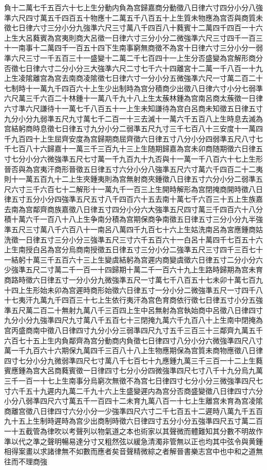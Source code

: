 負十二萬七千五百六十七上生分動内負為宫歸嘉商分動徵八日律六寸四分小分八強準六尺四寸萬五千四百五十物應十二萬五千八百五十上生質未物應為宫否與商質未徵七日律六寸三分小分九強準六尺三寸萬八千四百八十蕤賓十二萬四千四百一十六上生大呂蕤賓為宫夷則商大呂徵一日律六寸三分小分二微強準六尺三寸四千一百三十一南事十二萬四千一百五十四下生南事窮無商徵不為宮十日律六寸三分小分一弱準六尺三寸一千五百三十一盛變十二萬二千七百四十一上生分否盛變為宫解形商分否徵七日律六寸二分小分三大強準六尺二寸七千六十四離宮十二萬一千八百一十九上生凌隂離宫為宫去南商凌隂徵七日律六寸一分小分五微強凖六尺一寸萬二百二十七制時十一萬九千四百六十上生少出制時為宫分積商少出徵八日律六寸小分七弱準六尺萬三千六百二十林鍾十一萬八千九十八上生太蔟林鍾為宫南呂商太蔟徵一日律六寸準六尺謙待十一萬七千八百五十一上生未知謙待為宫白呂商未知徵五日律五寸九分小分九弱準五尺九寸萬七千二百一十三去滅十一萬六千五百八上生時息去滅為宫結躬商時息徵七日律五寸九分小分二弱準五尺九寸三千七百八十三安度十一萬四千九百四十上生屈齊安度為宫歸期商屈齊徵六日律五寸八分小分四弱準五尺八寸七千七百八十六歸嘉十一萬三千三百九十三上生随期歸嘉為宫未卯商随期徵六日律五寸七分小分六微強準五尺七寸萬一千九百九十九否與十一萬一千八百六十七上生形晉否與為宫夷汗商形晉徵五日律五寸六分小分八強準五尺六寸萬六千四百二十二夷則十一萬五百九十二上生夾鍾夷則為宫無射商夾鍾徵八日律五寸六分小分二弱準五尺六寸三千六百七十二解形十一萬九千一百三上生開時解形為宫閉掩商開時徵八日律五寸五分小分四強準五尺五寸八千四百六十五去南十萬七千六百三十五上生族嘉去南為宫鄰齊商族嘉徵八日律五寸四分小分六大強準五尺四寸萬三千四百六十八分積十萬六千一百八十八上生争南分積為宫期保商争南徵五日律五寸三分小分九半強準五尺三寸萬八千六百八十一南呂八萬四千九百七十六上生姑洗南呂為宮應鍾商姑洗徵一日律五寸三分小分三強準五尺三寸六千五百六十一白呂十萬四千七百五十六上生南授白呂為宫分烏商南授徵五日律五寸三分小分二強準五尺三寸四千三百七十一結躬十萬三千五百六十三上生變虞結躬為宫遲内商變虞徵六日律五寸二分小分六少強準五尺二寸萬二千一百一十四歸期十萬二千一百六十九上生路時歸期為宫未育商路時徵六日律五寸一分小分九微強準五尺一寸萬七千八百五十七未卯十萬七百九十四上生形始未卯為宫遲時商形始徵六日律五寸一分小分二微強準五尺一寸四千八十七夷汗九萬九千四百三十七上生依行夷汗為宫色育商依行徵七日律五寸小分五強準五尺萬二百二十無射九萬八千三百四上生中呂無射為宫執始商中呂徵八日律四寸九分小分九強準四尺九寸萬八千五百七十三閉掩九萬六千九百八十上生南中閉掩為宫丙盛商南中徵八日律四寸九分小分三弱準四尺九寸五千三百三十三鄰齊九萬五千六百七十五上生内負鄰齊為宫分動商内負徵七日律四寸八分小分六微強準四尺八寸萬一千九百六十六期保九萬四千三百八十八上生物應期保為宫質未商物應徵八日律四寸七分小分九微弱準四尺七寸萬八千七百七十九應鍾九萬三千三百一十二上生蕤賓應鍾為宫大呂商蕤賓徵一日律四寸七分小分四微強準四尺七寸八千十九分烏九萬三千一百一十七上生南事分烏窮次無徵不為宫七日律四寸七分小分三微強準四尺七寸六千五十九遲内九萬二千九十六上生盛變遲内為宫分否商盛變徵八日律四寸六分小分八弱準四尺六寸萬五千一百四十二未育九萬八百一十七上生離宫未育為宫凌隂商離宫徵八日律四寸六分小分一少強準四尺六寸二千七百五十二遲時八萬九千五百九十五上生制時遲時為宫少出商制時徵六日律四寸五分小分五強準四尺五寸萬二百一十五截管為律吹以考聲列以物氣道之本也術家以其聲微而體難知其分數不明故作準以代之準之聲明暢易達分寸又粗然弦以緩急清濁非管無以正也均其中弦令與黄鍾相得案畫以求諸律無不如數而應者矣音聲精微綜之者解晉書樂志宫中也中和之道無往而不理商強